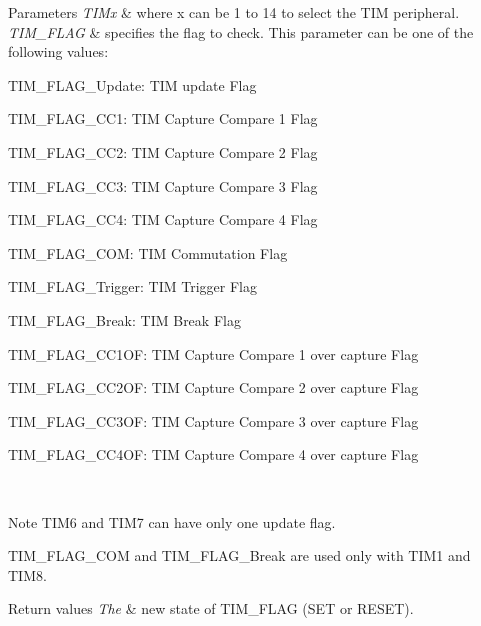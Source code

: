 \begin{DoxyParams}{Parameters}
{\em T\+I\+Mx} & where x can be 1 to 14 to select the T\+IM peripheral. \\
\hline
{\em T\+I\+M\+\_\+\+F\+L\+AG} & specifies the flag to check. This parameter can be one of the following values\+: \begin{DoxyItemize}
\item T\+I\+M\+\_\+\+F\+L\+A\+G\+\_\+\+Update\+: T\+IM update Flag \item T\+I\+M\+\_\+\+F\+L\+A\+G\+\_\+\+C\+C1\+: T\+IM Capture Compare 1 Flag \item T\+I\+M\+\_\+\+F\+L\+A\+G\+\_\+\+C\+C2\+: T\+IM Capture Compare 2 Flag \item T\+I\+M\+\_\+\+F\+L\+A\+G\+\_\+\+C\+C3\+: T\+IM Capture Compare 3 Flag \item T\+I\+M\+\_\+\+F\+L\+A\+G\+\_\+\+C\+C4\+: T\+IM Capture Compare 4 Flag \item T\+I\+M\+\_\+\+F\+L\+A\+G\+\_\+\+C\+OM\+: T\+IM Commutation Flag \item T\+I\+M\+\_\+\+F\+L\+A\+G\+\_\+\+Trigger\+: T\+IM Trigger Flag \item T\+I\+M\+\_\+\+F\+L\+A\+G\+\_\+\+Break\+: T\+IM Break Flag \item T\+I\+M\+\_\+\+F\+L\+A\+G\+\_\+\+C\+C1\+OF\+: T\+IM Capture Compare 1 over capture Flag \item T\+I\+M\+\_\+\+F\+L\+A\+G\+\_\+\+C\+C2\+OF\+: T\+IM Capture Compare 2 over capture Flag \item T\+I\+M\+\_\+\+F\+L\+A\+G\+\_\+\+C\+C3\+OF\+: T\+IM Capture Compare 3 over capture Flag \item T\+I\+M\+\_\+\+F\+L\+A\+G\+\_\+\+C\+C4\+OF\+: T\+IM Capture Compare 4 over capture Flag\end{DoxyItemize}
\\
\hline
\end{DoxyParams}
\begin{DoxyNote}{Note}
T\+I\+M6 and T\+I\+M7 can have only one update flag. 

T\+I\+M\+\_\+\+F\+L\+A\+G\+\_\+\+C\+OM and T\+I\+M\+\_\+\+F\+L\+A\+G\+\_\+\+Break are used only with T\+I\+M1 and T\+I\+M8.
\end{DoxyNote}

\begin{DoxyRetVals}{Return values}
{\em The} & new state of T\+I\+M\+\_\+\+F\+L\+AG (S\+ET or R\+E\+S\+ET). \\
\hline
\end{DoxyRetVals}


